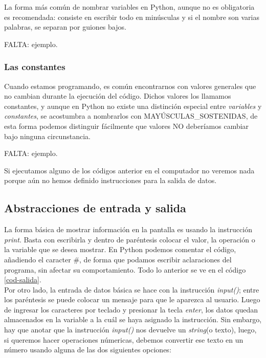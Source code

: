 La forma más común de nombrar variables en Python, aunque no es obligatoria es recomendada: consiste en escribir todo en minúsculas y si el nombre son varias palabras, se separan por guiones bajos.

FALTA: ejemplo.

\subsubsection{Las constantes}

Cuando estamos programando, es común encontrarnos con valores generales que no cambian durante la ejecución del código. Dichos valores los llamamos constantes, y aunque en Python no existe una distinción especial entre \emph{variables} y \emph{constantes}, se acostumbra a nombrarlos con MAYÚSCULAS\_SOSTENIDAS, de esta forma podemos distinguir fácilmente que valores NO deberíamos cambiar bajo ninguna circunstancia.

FALTA: ejemplo.

Si ejecutamos alguno de los códigos anterior en el computador no veremos nada porque aún no hemos definido instrucciones para la salida de datos.

\subsection{Abstracciones de entrada y salida}

La forma básica de mostrar información en la pantalla es usando la instrucción \emph{print}. Basta con escribirla y dentro de paréntesis colocar el valor, la operación o la variable que se desea mostrar. En Python podemos comentar el código, añadiendo el caracter \#, de forma que podamos escribir aclaraciones del programa, sin afectar su comportamiento. Todo lo anterior se ve en el código \ref{cod-salida}. \\




Por otro lado, la entrada de datos básica se hace con la instrucción \emph{input()}; entre los paréntesis se puede colocar un mensaje para que le aparezca al usuario. Luego de ingresar los caracteres por teclado y presionar la tecla \emph{enter}, los datos quedan almacenados en la variable a la cuál se haya asignado la instrucción. Sin embargo, hay que anotar que la instrucción \emph{input()} nos devuelve un \emph{string}(o texto), luego, si queremos hacer operaciones númericas, debemos convertir ese texto en un número usando alguna de las dos siguientes opciones:

